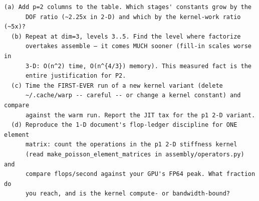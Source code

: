 \begin{explore}
\begin{verbatim}
(a) Add p=2 columns to the table. Which stages' constants grow by the
      DOF ratio (~2.25x in 2-D) and which by the kernel-work ratio (~5x)?
  (b) Repeat at dim=3, levels 3..5. Find the level where factorize
      overtakes assemble — it comes MUCH sooner (fill-in scales worse in
      3-D: O(n^2) time, O(n^{4/3}) memory). This measured fact is the
      entire justification for P2.
  (c) Time the FIRST-EVER run of a new kernel variant (delete
      ~/.cache/warp -- careful -- or change a kernel constant) and compare
      against the warm run. Report the JIT tax for the p1 2-D variant.
  (d) Reproduce the 1-D document's flop-ledger discipline for ONE element
      matrix: count the operations in the p1 2-D stiffness kernel
      (read make_poisson_element_matrices in assembly/operators.py) and
      compare flops/second against your GPU's FP64 peak. What fraction do
      you reach, and is the kernel compute- or bandwidth-bound?
\end{verbatim}
\end{explore}
